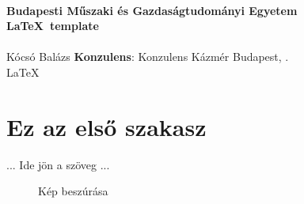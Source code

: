 \documentclass[12pt,a4paper,oneside]{article}             	%
\newcommand{\doctitle}{\LaTeX\ template}
\newcommand{\docsubtitle}{}
\newcommand{\docauthor}{Kócsó Balázs}
\newcommand{\docconsultant}{Konzulens Kázmér}
\newcommand{\docplace}{Budapest}
\newcommand{\docyear}{\the\year}
\begin{document}
\begin{titlepage}
\begin{center}
     \\
    {\large \bf Budapesti Műszaki és Gazdaságtudományi Egyetem} \\
    \vfill {\Huge \bf \doctitle \mbox{}} \\
    [15pt]{\Large \docsubtitle \mbox{}} \\
    [30pt]{\Huge \docauthor} \vfill
    {\bf Konzulens}: \docconsultant
    \vfill
    {\Large \docplace, \docyear.} \\
    \LaTeX %
\end{center}
\end{titlepage}

\section{Ez az első szakasz}
... Ide jön a szöveg ...

\begin{figure}[H]	%
\center
{}
\caption{Kép beszúrása}
\label{picture}		%
\end{figure}





%
%
\end{document}
